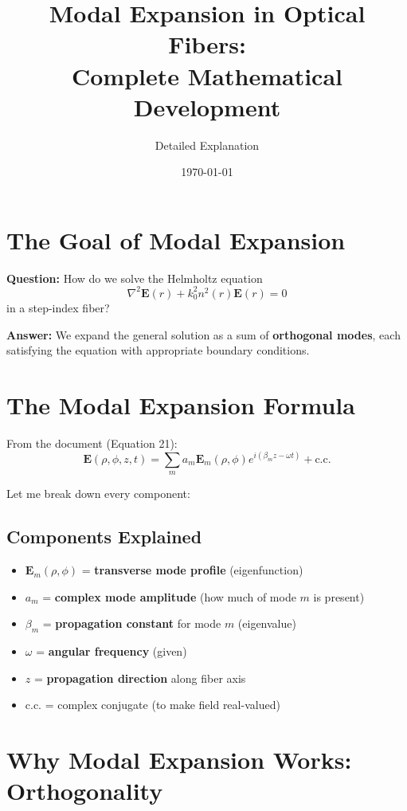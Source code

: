 \documentclass[12pt]{article}
\title{Modal Expansion in Optical Fibers: \\
Complete Mathematical Development}
\author{Detailed Explanation}
\date{\today}
\begin{document}
\maketitle

\section{The Goal of Modal Expansion}

\textbf{Question:} How do we solve the Helmholtz equation
$$\nabla^2 \mathbf{E}(r) + k_0^2 n^2(r) \mathbf{E}(r) = 0$$
in a step-index fiber?

\textbf{Answer:} We expand the general solution as a sum of \textbf{orthogonal modes}, each satisfying the equation with appropriate boundary conditions.

\section{The Modal Expansion Formula}

From the document (Equation 21):
\begin{equation}
\boxed{\mathbf{E}(\rho, \phi, z, t) = \sum_m a_m \mathbf{E}_m(\rho, \phi) e^{i(\beta_m z - \omega t)} + \text{c.c.}}
\end{equation}

Let me break down every component:

\subsection{Components Explained}

\begin{itemize}
\item $\mathbf{E}_m(\rho, \phi)$ = \textbf{transverse mode profile} (eigenfunction)
\item $a_m$ = \textbf{complex mode amplitude} (how much of mode $m$ is present)
\item $\beta_m$ = \textbf{propagation constant} for mode $m$ (eigenvalue)
\item $\omega$ = \textbf{angular frequency} (given)
\item $z$ = \textbf{propagation direction} along fiber axis
\item c.c. = complex conjugate (to make field real-valued)
\end{itemize}

\section{Why Modal Expansion Works: Orthogonality}
\end{document}
